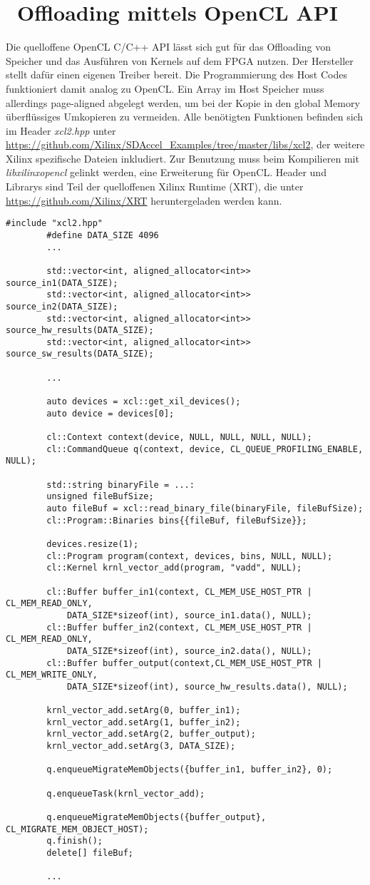 		\section{~Offloading mittels OpenCL API}
		Die quelloffene OpenCL C/C++ \Gls{API} lässt sich gut für das Offloading von Speicher und das Ausführen von \Glspl{Kernel} auf dem FPGA nutzen. Der Hersteller stellt dafür einen eigenen Treiber bereit. Die Programmierung des Host Codes funktioniert damit analog zu OpenCL. Ein Array im Host Speicher muss allerdings page-aligned abgelegt werden, um bei der Kopie in den \gls{global Memory} überflüssiges Umkopieren zu vermeiden. Alle benötigten Funktionen befinden sich im Header \textit{xcl2.hpp} unter \url{https://github.com/Xilinx/SDAccel_Examples/tree/master/libs/xcl2}, der weitere Xilinx spezifische Dateien inkludiert. Zur Benutzung muss beim Kompilieren mit \textit{libxilinxopencl} gelinkt werden, eine Erweiterung für OpenCL. Header und Librarys sind Teil der quelloffenen Xilinx Runtime (XRT), die unter \url{https://github.com/Xilinx/XRT} heruntergeladen werden kann.		
		\begin{lstlisting}[caption=~FPGA: Host Programm]
		#include "xcl2.hpp"
		#define DATA_SIZE 4096
		...

		std::vector<int, aligned_allocator<int>> source_in1(DATA_SIZE);
		std::vector<int, aligned_allocator<int>> source_in2(DATA_SIZE);
		std::vector<int, aligned_allocator<int>> source_hw_results(DATA_SIZE);
		std::vector<int, aligned_allocator<int>> source_sw_results(DATA_SIZE);

		...

		auto devices = xcl::get_xil_devices();
		auto device = devices[0];

		cl::Context context(device, NULL, NULL, NULL, NULL);
		cl::CommandQueue q(context, device, CL_QUEUE_PROFILING_ENABLE, NULL);

		std::string binaryFile = ...:
		unsigned fileBufSize;
		auto fileBuf = xcl::read_binary_file(binaryFile, fileBufSize);
		cl::Program::Binaries bins{{fileBuf, fileBufSize}};

		devices.resize(1);
		cl::Program program(context, devices, bins, NULL, NULL);
		cl::Kernel krnl_vector_add(program, "vadd", NULL);

		cl::Buffer buffer_in1(context, CL_MEM_USE_HOST_PTR | CL_MEM_READ_ONLY, 
			DATA_SIZE*sizeof(int), source_in1.data(), NULL);
		cl::Buffer buffer_in2(context, CL_MEM_USE_HOST_PTR | CL_MEM_READ_ONLY,
			DATA_SIZE*sizeof(int), source_in2.data(), NULL);
		cl::Buffer buffer_output(context,CL_MEM_USE_HOST_PTR | CL_MEM_WRITE_ONLY, 
			DATA_SIZE*sizeof(int), source_hw_results.data(), NULL);

		krnl_vector_add.setArg(0, buffer_in1);
		krnl_vector_add.setArg(1, buffer_in2);
		krnl_vector_add.setArg(2, buffer_output);
		krnl_vector_add.setArg(3, DATA_SIZE);

		q.enqueueMigrateMemObjects({buffer_in1, buffer_in2}, 0);

		q.enqueueTask(krnl_vector_add);

		q.enqueueMigrateMemObjects({buffer_output}, CL_MIGRATE_MEM_OBJECT_HOST);
		q.finish();
		delete[] fileBuf;
    
		...	
		\end{lstlisting}
		
